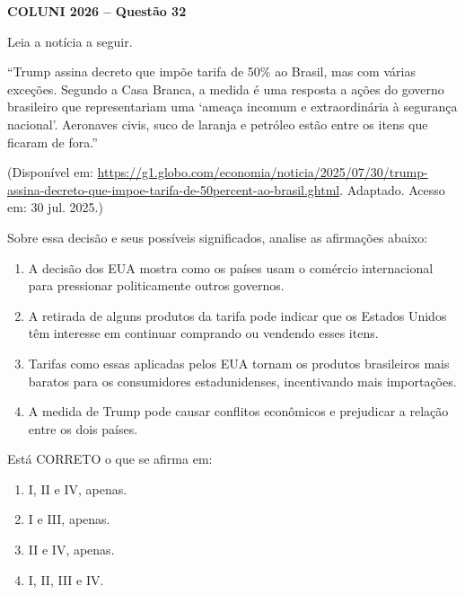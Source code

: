 \textbf{COLUNI 2026 -- Questão 32}\par\medskip Leia a notícia a seguir.

“Trump assina decreto que impõe tarifa de 50\% ao Brasil, mas com várias exceções. Segundo a Casa Branca, a medida é uma resposta a ações do governo brasileiro que representariam uma ‘ameaça incomum e extraordinária à segurança nacional’. Aeronaves civis, suco de laranja e petróleo estão entre os itens que ficaram de fora.”\par
(Disponível em: \url{https://g1.globo.com/economia/noticia/2025/07/30/trump-assina-decreto-que-impoe-tarifa-de-50percent-ao-brasil.ghtml}. Adaptado. Acesso em: 30 jul. 2025.)

Sobre essa decisão e seus possíveis significados, analise as afirmações abaixo:
\begin{enumerate}
\item[I.] A decisão dos EUA mostra como os países usam o comércio internacional para pressionar politicamente outros governos.
\item[II.] A retirada de alguns produtos da tarifa pode indicar que os Estados Unidos têm interesse em continuar comprando ou vendendo esses itens.
\item[III.] Tarifas como essas aplicadas pelos EUA tornam os produtos brasileiros mais baratos para os consumidores estadunidenses, incentivando mais importações.
\item[IV.] A medida de Trump pode causar conflitos econômicos e prejudicar a relação entre os dois países.
\end{enumerate}
Está CORRETO o que se afirma em:\begin{enumerate}
\item I, II e IV, apenas.
\item I e III, apenas.
\item II e IV, apenas.
\item I, II, III e IV.\end{enumerate}